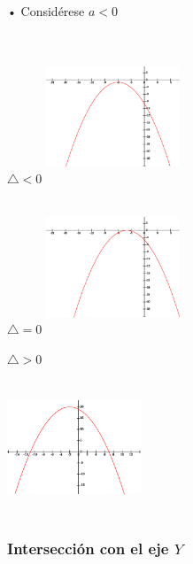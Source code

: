 • Considérese $a<0$
\\
\\
\hfill
\begin{minipage}{.20\textwidth}
\begin{center}
$\bigtriangleup<0$
\includegraphics[height=4cm,width=4cm]{xx2.eps} 
\end{center} 
\end{minipage}
\hfill
\begin{minipage}{.20\textwidth}
\begin{center}
$\bigtriangleup=0$
\includegraphics[height=4cm,width=4cm]{xx3.eps} 
\end{center} 
\end{minipage}
\hfill
\begin{minipage}{.20\textwidth}
\begin{center}
$\bigtriangleup>0$

\includegraphics[height=4cm,width=4cm]{xx6.eps} 
\end{center} 
\end{minipage}
\hfill


\subsubsection{Intersección con el eje $Y$}

